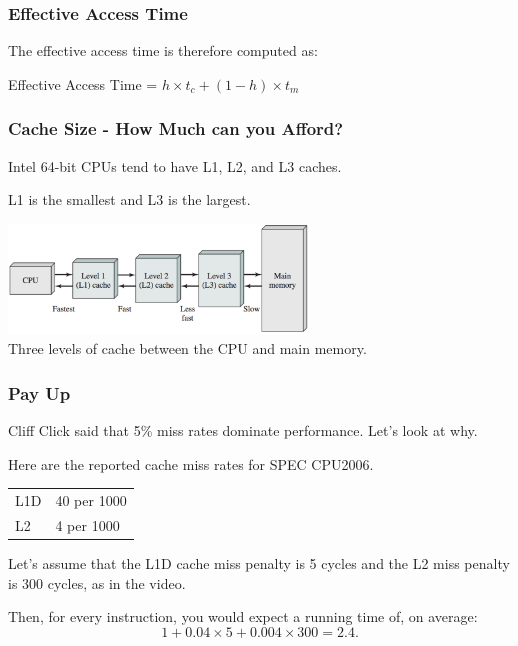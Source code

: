 \begin{frame}
\frametitle{Effective Access Time}

 The effective access time is therefore computed as:

\begin{center}
Effective Access Time = $h \times t_{c} + (1-h) \times t_{m}$
\end{center}

\end{frame}



\begin{frame}
\frametitle{Cache Size - How Much can you Afford?}

Intel 64-bit CPUs tend to have L1, L2, and L3 caches. 

L1 is the smallest and L3 is the largest.

\begin{center}
\includegraphics[width=0.6\textwidth]{images/caches.png}\\
Three levels of cache between the CPU and main memory.
\end{center}


\end{frame}



\begin{frame}
\frametitle{Pay Up}

Cliff Click said that 5\% miss rates dominate performance. Let's look at why.

Here are the reported cache miss rates for SPEC CPU2006.

\begin{center}
\begin{tabular}{ll}
L1D & 40 per 1000 \\
L2 & 4 per 1000
\end{tabular}
\end{center}

Let's assume that the L1D cache miss penalty is 5 cycles and the L2 miss penalty is
300 cycles, as in the video. 

Then, for every instruction, you would expect a running
time of, on average:
\[ 1 + 0.04 \times 5 + 0.004 \times 300 = 2.4. \]

\end{frame}



